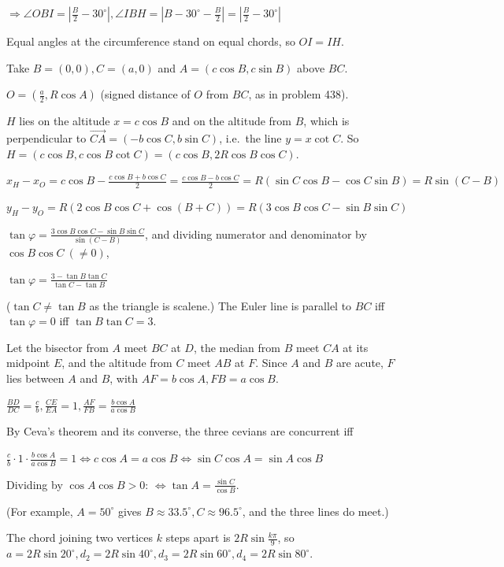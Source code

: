   $\Rightarrow \angle OBI = \left|\frac{B}{2} - 30^\circ\right|, \angle IBH = \left|B - 30^\circ -
  \frac{B}{2}\right| = \left|\frac{B}{2} - 30^\circ\right|$

  Equal angles at the circumference stand on equal chords, so $OI = IH$.
\item Take $B = (0, 0), C = (a, 0)$ and $A = (c\cos B, c\sin B)$ above $BC$.

  $O = \left(\frac{a}{2}, R\cos A\right)$ (signed distance of $O$ from $BC$, as in problem 438).

  $H$ lies on the altitude $x = c\cos B$ and on the altitude from $B$, which is perpendicular to $\overrightarrow{CA}
  = (-b\cos C, b\sin C)$, i.e.\ the line $y = x\cot C$. So $H = (c\cos B, c\cos B\cot C) = (c\cos B, 2R\cos B\cos
  C)$.

  $x_H - x_O = c\cos B - \frac{c\cos B + b\cos C}{2} = \frac{c\cos B - b\cos C}{2} = R(\sin C\cos B - \cos C\sin
  B) = R\sin(C - B)$

  $y_H - y_O = R(2\cos B\cos C + \cos(B + C)) = R(3\cos B\cos C - \sin B\sin C)$

  $\tan\varphi = \frac{3\cos B\cos C - \sin B\sin C}{\sin(C - B)}$, and dividing numerator and denominator by
  $\cos B\cos C\ (\neq 0)$,

  $\tan\varphi = \frac{3 - \tan B\tan C}{\tan C - \tan B}$

  ($\tan C\neq\tan B$ as the triangle is scalene.) The Euler line is parallel to $BC$ iff $\tan\varphi = 0$ iff
  $\tan B\tan C = 3$.
\item Let the bisector from $A$ meet $BC$ at $D$, the median from $B$ meet $CA$ at its midpoint $E$, and the
  altitude from $C$ meet $AB$ at $F$. Since $A$ and $B$ are acute, $F$ lies between $A$ and $B$, with $AF =
  b\cos A, FB = a\cos B$.

  $\frac{BD}{DC} = \frac{c}{b}, \frac{CE}{EA} = 1, \frac{AF}{FB} = \frac{b\cos A}{a\cos B}$

  By Ceva's theorem and its converse, the three cevians are concurrent iff

  $\frac{c}{b}\cdot1\cdot\frac{b\cos A}{a\cos B} = 1\iff c\cos A = a\cos B\iff \sin C\cos A = \sin A\cos B$

  Dividing by $\cos A\cos B > 0$: $\iff \tan A = \frac{\sin C}{\cos B}$.

  (For example, $A = 50^\circ$ gives $B\approx 33.5^\circ, C\approx 96.5^\circ$, and the three lines do meet.)
\item The chord joining two vertices $k$ steps apart is $2R\sin\frac{k\pi}{9}$, so $a = 2R\sin20^\circ, d_2 =
  2R\sin40^\circ, d_3 = 2R\sin60^\circ, d_4 = 2R\sin80^\circ$.

